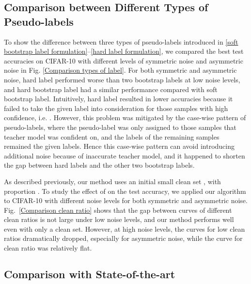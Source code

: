 \documentclass[conference]{IEEEtran}
\begin{document}
\begin{algorithm}[H]
\subsection{Comparison between Different Types of Pseudo-labels}
To show the difference between three types of pseudo-labels introduced in \eqref{soft bootstrap label formulation}--\eqref{hard label formulation}, we compared the best test accuracies on CIFAR-10 with different levels of symmetric noise and asymmetric noise in Fig. \ref{Comparison types of label}.
For both symmetric and asymmetric noise, hard label performed worse than two bootstrap labels at low noise levels, and hard bootstrap label had a similar performance compared with soft bootstrap label.
Intuitively, hard label resulted in lower accuracies because it failed to take the given label into consideration for those samples with high confidence, i.e. . However, this problem was mitigated by the case-wise pattern of pseudo-labels, where the pseudo-label was only assigned to those samples that teacher model was confident on, and the labels of the remaining samples remained the given labels. Hence this case-wise pattern can avoid introducing additional noise because of inaccurate teacher model, and it happened to shorten the gap between hard labels and the other two bootstrap labels.



As described previously, our method uses an initial small clean set , with proportion . To study the effect of  on the test accuracy, we applied our algorithm to CIFAR-10 with different noise levels for both symmetric and asymmetric noise. \mbox{Fig. \ref{Comparison clean ratio}} shows that the gap between curves of different clean ratios is not large under low noise levels, and our method performs well even with only a  clean set. However, at high noise levels, the curves for low clean ratios dramatically dropped, especially for asymmetric noise, while the curve for  clean ratio was relatively flat. 



\subsection{Comparison with State-of-the-art}

\end{algorithm}
\end{document}
